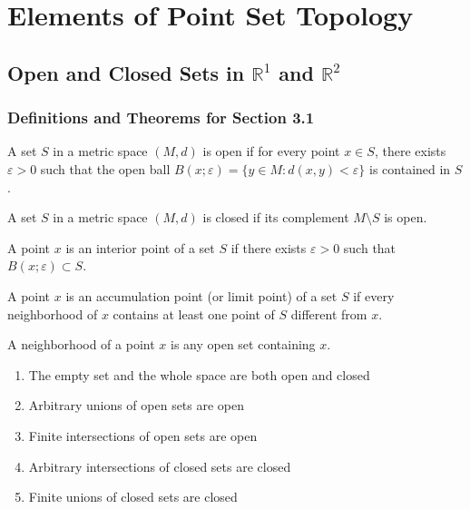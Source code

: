 \chapter{Elements of Point Set Topology}

\section{Open and Closed Sets in $\mathbb{R}^1$ and $\mathbb{R}^2$}

\subsection*{Definitions and Theorems for Section 3.1}

\begin{definition}
A set $S$ in a metric space $(M,d)$ is open if for every point $x \in S$, there exists $\varepsilon > 0$ such that the open ball $B(x;\varepsilon) = \{y \in M : d(x,y) < \varepsilon\}$ is contained in $S$.
\end{definition}

\begin{definition}
A set $S$ in a metric space $(M,d)$ is closed if its complement $M \setminus S$ is open.
\end{definition}

\begin{definition}
A point $x$ is an interior point of a set $S$ if there exists $\varepsilon > 0$ such that $B(x;\varepsilon) \subset S$.
\end{definition}

\begin{definition}
A point $x$ is an accumulation point (or limit point) of a set $S$ if every neighborhood of $x$ contains at least one point of $S$ different from $x$.
\end{definition}

\begin{definition}[Neighborhood]
A neighborhood of a point $x$ is any open set containing $x$.
\end{definition}

\begin{theorem}
\begin{enumerate}
\item The empty set and the whole space are both open and closed
\item Arbitrary unions of open sets are open
\item Finite intersections of open sets are open
\item Arbitrary intersections of closed sets are closed
\item Finite unions of closed sets are closed
\end{enumerate}
\end{theorem}

